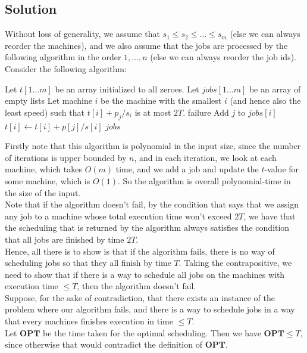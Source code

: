\documentclass[a4paper]{article}
\newcommand{\nl}{\vspace{0.2cm}\\}
\newcommand{\OPT}{\mathbf{OPT}}
\begin{document}
\subsection{Solution}
Without loss of generality, we assume that $s_1 \le s_2 \le \ldots \le s_m$ (else we can always reorder the machines), and we also assume that the jobs are processed by the following algorithm in the order $1, \ldots, n$ (else we can always reorder the job ids).
Consider the following algorithm:
\begin{algorithmic}[1]
        \State Let $t[1 \ldots m]$ be an array initialized to all zeroes.
        \State Let $jobs[1 \ldots m]$ be an array of empty lists
            \State Let machine $i$ be the machine with the smallest $i$ (and hence also the least speed) such that $t[i] + p_j / s_i$ is at most $2T$.
                \State \Return failure
            \EndIf
            \State Add $j$ to $jobs[i]$
            \State $t[i] \gets t[i] + p[j] / s[i]$
        \EndFor
        \State \Return $jobs$
    \EndFunction
\end{algorithmic}
Firstly note that this algorithm is polynomial in the input size, since the number of iterations is upper bounded by $n$, and in each iteration, we look at each machine, which takes $O(m)$ time,
and we add a job and update the $t$-value for some machine, which is $O(1)$. So the algorithm is overall polynomial-time in the size of the input.\nl
Note that if the algorithm doesn't fail, by the condition that says that we assign any job to a machine whose total execution time won't exceed $2T$, we have that the scheduling that is
returned by the algorithm always satisfies the condition that all jobs are finished by time $2T$.\nl
Hence, all there is to show is that if the algorithm fails, there is no way of scheduling jobs so that they all finish by time $T$. Taking the contrapositive, we need to show that if there is
a way to schedule all jobs on the machines with execution time $\le T$, then the algorithm doesn't fail.\nl
Suppose, for the sake of contradiction, that there exists an instance of the problem where our algorithm fails, and there is a way to schedule jobs in a way that every machines finishes
execution in time $\le T$.\nl
Let $\OPT$ be the time taken for the optimal scheduling. Then we have $\OPT \le T$, since otherwise that would contradict the definition of $\OPT$.\nl
\end{document}
